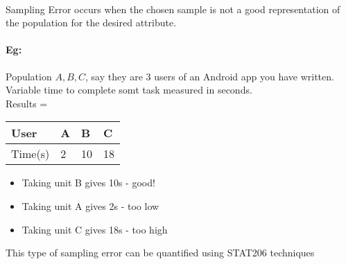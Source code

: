 \documentclass[12pt]{report}
\begin{document}
    \paragraph{} Sampling Error occurs when the chosen sample is not a good
    representation of the population for the desired attribute.

    \paragraph{Eg:} Population ${A, B, C}$, say they are 3 users of an Android
    app you have written. \\
    Variable time to complete somt task measured in seconds.\\

   Results =
    \begin{tabular}{l | l | l | l }
      User    & A & B  & C  \\
      \hline
      Time(s) & 2 & 10 & 18 \\
    \end{tabular}

    \begin{itemize}
      \item Taking unit B gives 10s - good!
      \item Taking unit A gives 2s - too low
      \item Taking unit C gives 18s - too high
    \end{itemize}
    This type of sampling error can be quantified using STAT206 techniques
\end{document}
